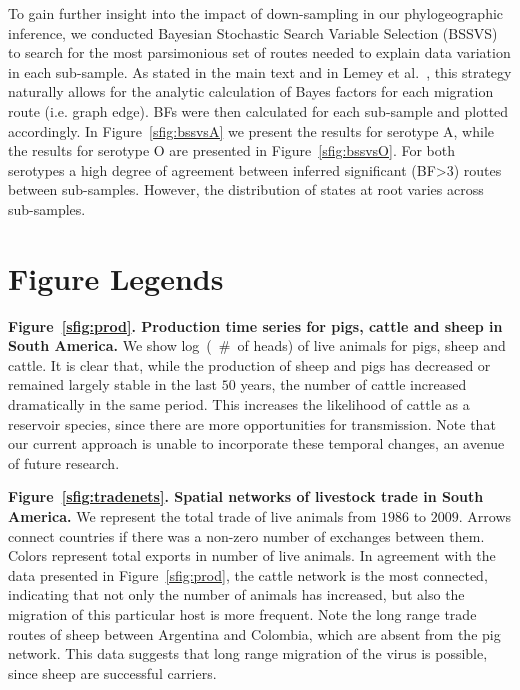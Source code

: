 \documentclass[a4paper,10pt]{article}
\begin{document}
To gain further insight into the impact of down-sampling in our phylogeographic inference, we conducted Bayesian Stochastic Search Variable Selection (BSSVS) to search for the most parsimonious set of routes needed to explain data variation in each sub-sample.
As stated in the main text and in Lemey et al.~\cite{M-roots}, this strategy naturally allows for the analytic calculation of Bayes factors for each migration route (i.e. graph edge).
BFs were then calculated for each sub-sample and plotted accordingly.
In Figure~\ref{sfig:bssvsA} we present the results for serotype A, while the results for serotype O are presented in Figure~\ref{sfig:bssvsO}.
For both serotypes a high degree of agreement between inferred significant (BF>3) routes between sub-samples.
However, the distribution of states at root varies across sub-samples.




\section*{Figure Legends}

\textbf{Figure~\ref{sfig:prod}. Production time series for pigs, cattle and sheep in South America.}
We show log~(~\#~of heads) of live animals for pigs, sheep and cattle.
It is clear that, while the production of sheep and pigs has decreased or remained largely stable in the last $50$ years, the number of cattle increased dramatically in the same period.
This increases the likelihood of cattle as a reservoir species, since there are more opportunities for transmission.
Note that our current approach is unable to incorporate these temporal changes, an avenue of future research.

\textbf{Figure~\ref{sfig:tradenets}. Spatial networks of livestock trade in South America.}
We represent the total trade of live animals from $1986$ to $2009$.
Arrows connect countries if there was a non-zero number of exchanges between them.
Colors represent total exports in number of live animals.
In agreement with the data presented in Figure~\ref{sfig:prod}, the cattle network is the most connected, indicating that not only the number of animals has increased, but also the migration of this particular host is more frequent. 
Note the long range trade routes of sheep between Argentina and Colombia, which are absent from the pig network.
This data suggests that long range migration of the virus is possible, since sheep are successful carriers.
\end{document}
